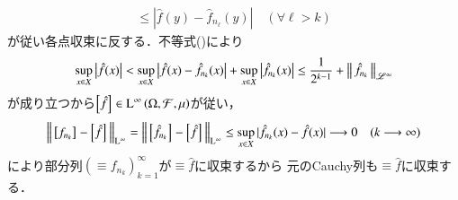 \begin{prf}
\begin{description}
\begin{align}
				\leq \left| \hat{f}(y) - \hat{f}_{n_\ell}(y) \right|
				\quad (\forall \ell > k)
			\end{align}
			が従い各点収束に反する．不等式()により
			\begin{align}
				\operatorname*{sup}_{x \in X} \left| \hat{f}(x) \right| 
				< \operatorname*{sup}_{x \in X} \left| \hat{f}(x) - \hat{f}_{n_k}(x) \right| + \operatorname*{sup}_{x \in X} \left| \hat{f}_{n_k}(x) \right| 
				\leq \frac{1}{2^{k-1}} + \left\|\, \hat{f}_{n_k}\, \right\|_{\mathscr{L}^\infty}
			\end{align}
			が成り立つから$\left[\hat{f}\right]_{} \in \operatorname{L}^{\infty} \left(\Omega,\mathcal{F},\mu\right)$が従い，
			\begin{align}
				\left\|\, \left[f_{n_k}\right]_{} - \left[\hat{f}\right]_{}\, \right\|_{\mathrm{L}^\infty}
				= \left\|\, \left[\hat{f}_{n_k}\right]_{} - \left[\hat{f}\right]_{}\, \right\|_{\mathrm{L}^\infty}
				\leq \operatorname*{sup}_{x \in X} |\hat{f}_{n_k}(x) - \hat{f}(x)|
				\longrightarrow 0 \quad (k \longrightarrow \infty)
			\end{align}
			により部分列$\left( \equiv{f_{n_k}}{} \right)_{k=1}^{\infty}$が$\equiv{\hat{f}}{}$に収束するから
			元のCauchy列も$\equiv{\hat{f}}{}$に収束する．
			

\end{description}
\end{prf}
